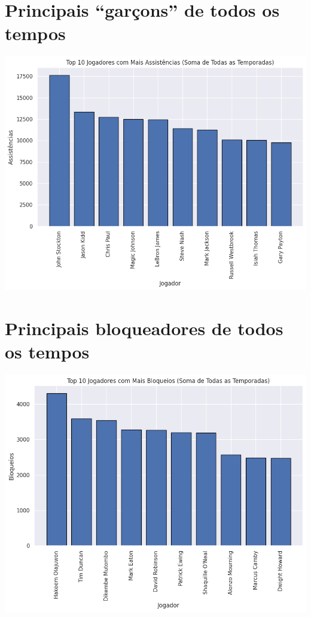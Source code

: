 \documentclass[
]{book}
\begin{document}
\hypertarget{principais-garuxe7ons-de-todos-os-tempos}{%
\section{Principais ``garçons'' de todos os tempos}\label{principais-garuxe7ons-de-todos-os-tempos}}

\includegraphics{imagens/17.png}

\hypertarget{principais-bloqueadores-de-todos-os-tempos}{%
\section{Principais bloqueadores de todos os tempos}\label{principais-bloqueadores-de-todos-os-tempos}}

\includegraphics{imagens/18.png}
\end{document}
